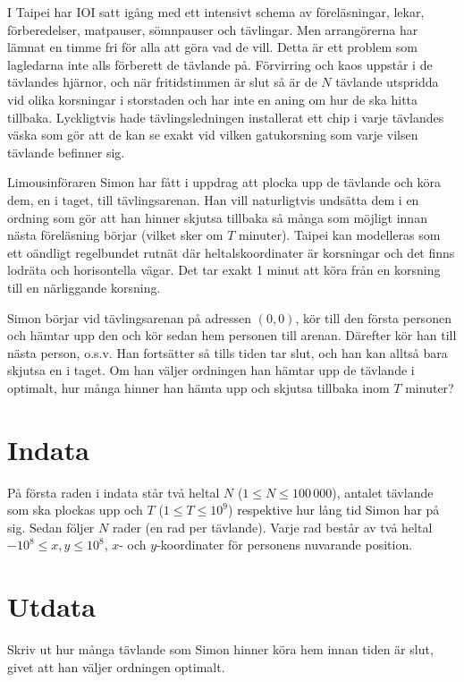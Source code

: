 I Taipei har IOI satt igång med ett intensivt schema av föreläsningar, lekar,
förberedelser, matpauser, sömnpauser och tävlingar. Men arrangörerna har lämnat
en timme fri för alla att göra vad de vill. Detta är ett problem som lagledarna
inte alls förberett de tävlande på. Förvirring och kaos uppstår i de tävlandes
hjärnor, och när fritidstimmen är slut så är de $N$ tävlande utspridda vid
olika korsningar i storstaden och har inte en aning om hur de ska hitta
tillbaka. Lyckligtvis hade tävlingsledningen installerat ett chip i varje
tävlandes väska som gör att de kan se exakt vid vilken gatukorsning som varje
vilsen tävlande befinner sig.

Limousinföraren Simon har fått i uppdrag att plocka upp de tävlande och köra
dem, en i taget, till tävlingsarenan. Han vill naturligtvis undsätta dem i en
ordning som gör att han hinner skjutsa tillbaka så många som möjligt innan
nästa föreläsning börjar (vilket sker om $T$ minuter). Taipei kan modelleras
som ett oändligt regelbundet rutnät där heltalskoordinater är korsningar och
det finns lodräta och horisontella vägar. Det tar exakt 1 minut att köra från
en korsning till en närliggande korsning.

Simon börjar vid tävlingsarenan på adressen $(0, 0)$, kör till den första
personen och hämtar upp den och kör sedan hem personen till arenan. Därefter
kör han till nästa person, o.s.v. Han fortsätter så tills tiden tar slut, och
han kan alltså bara skjutsa en i taget. Om han väljer ordningen han hämtar upp
de tävlande i optimalt, hur många hinner han hämta upp och skjutsa tillbaka
inom $T$ minuter?

\section*{Indata}
På första raden i indata står två heltal $N$ ($1 \leq N \leq 100\,000$), antalet tävlande som ska plockas upp och $T$ ($1 \leq T \leq 10^9$)
respektive hur lång tid Simon har på sig. Sedan följer $N$ rader (en rad per tävlande). Varje rad består av
två heltal $-10^8 \leq x, y \leq 10^8$, $x$- och $y$-koordinater för personens
nuvarande position.

\section*{Utdata}
Skriv ut hur många tävlande som Simon hinner köra hem innan tiden är slut,
givet att han väljer ordningen optimalt.

